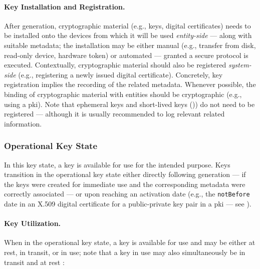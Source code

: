 
\paragraph*{Key Installation and Registration.} After generation, cryptographic material (e.g., keys, digital certificates) needs to be installed onto the devices from which it will be used \textit{entity-side} --- along with suitable metadata; the installation may be either manual (e.g., transfer from disk, read-only device, hardware token) or automated --- granted a secure protocol is executed. Contextually, cryptographic material should also be registered \textit{system-side} (e.g., registering a newly issued digital certificate). Concretely, key registration implies the recording of the related metadata. Whenever possible, the binding of cryptographic material with entities should be cryptographic (e.g., using a \gls{pki}). Note that ephemeral keys and short-lived keys ()) do not need to be registered --- although it is usually recommended to log relevant related information.


\subsubsection{Operational Key State}\label{sec:key_management:lifecycle:operational}

In this key state, a key is available for use for the intended purpose. Keys transition in the operational key state either directly following generation --- if the keys were created for immediate use and the corresponding metadata were correctly associated --- or upon reaching an activation date (e.g., the \texttt{notBefore} date in an X.509 digital certificate for a public-private key pair in a \gls{pki} \cite{rfc5280} --- see ).


\paragraph*{Key Utilization.} When in the operational key state, a key is available for use and may be either at rest, in transit, or in use; note that a key in use may also simultaneously be in transit and at rest \cite{barker_recommendation_2020_p1}:

